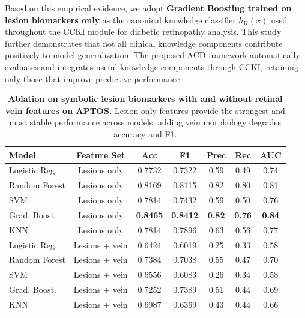 \documentclass[runningheads]{llncs}
\begin{document}
Based on this empirical evidence, we adopt \textbf{Gradient Boosting trained on lesion biomarkers only} as the canonical knowledge classifier $h_{\mathrm{K}}(x)$ used throughout the CCKI module for diabetic retinopathy analysis. This study further demonstrates that not all clinical knowledge components contribute positively to model generalization. The proposed ACD framework automatically evaluates and integrates useful knowledge components through CCKI, retaining only those that improve predictive performance.
\begin{table}[!h]
\centering
\scriptsize
\vspace{0.25em}
\setlength{\tabcolsep}{3pt}
\caption{\textbf{Ablation on symbolic lesion biomarkers with and without retinal vein features on APTOS.} Lesion-only features provide the strongest and most stable performance across models; adding vein morphology degrades accuracy and F1.}
\begin{tabular}{l|c|c|c|c|c|c}
\toprule
\textbf{Model} & \textbf{Feature Set} & \textbf{Acc} & \textbf{F1} & \textbf{Prec} & \textbf{Rec} & \textbf{AUC} \\
\midrule
Logistic Reg. & Lesions only      & 0.7732 & 0.7322 & 0.59 & 0.49 & 0.74 \\
Random Forest & Lesions only      & 0.8169 & 0.8115 & 0.82 & 0.80 & 0.81 \\
SVM           & Lesions only      & 0.7814 & 0.7432 & 0.59 & 0.50 & 0.76 \\
Grad. Boost.  & Lesions only      & \textbf{0.8465} & \textbf{0.8412} & \textbf{0.82} & \textbf{0.76} & \textbf{0.84} \\
KNN           & Lesions only      & 0.7814 & 0.7896 & 0.63 & 0.56  & 0.77 \\
\midrule
Logistic Reg. & Lesions + vein    & 0.6424 & 0.6019 & 0.25 & 0.33 & 0.58 \\
Random Forest & Lesions + vein    & 0.7384 & 0.7038 & 0.55 & 0.47 & 0.70 \\
SVM           & Lesions + vein    & 0.6556 & 0.6083 & 0.26 & 0.34  & 0.58 \\
Grad. Boost.  & Lesions + vein    & 0.7252 & 0.7389 & 0.51 & 0.44 & 0.69 \\
KNN           & Lesions + vein    & 0.6987 & 0.6369 & 0.43 & 0.44 & 0.66 \\
\bottomrule
\end{tabular}

\label{tab:ablation_symbolic}
\end{table}
\end{document}

